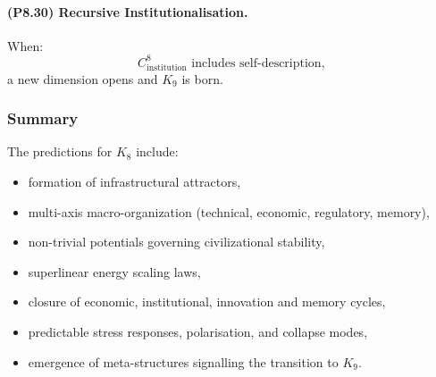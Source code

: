 \paragraph{(P8.30) Recursive Institutionalisation.}
When:
\[
C_{\mathrm{institution}}^8 
\text{ includes self-description},
\]
a new dimension opens and $K_9$ is born.

\subsubsection{Summary}

The predictions for $K_8$ include:
\begin{itemize}
    \item formation of infrastructural attractors,
    \item multi-axis macro-organization (technical, economic, regulatory, memory),
    \item non-trivial potentials governing civilizational stability,
    \item superlinear energy scaling laws,
    \item closure of economic, institutional, innovation and memory cycles,
    \item predictable stress responses, polarisation, and collapse modes,
    \item emergence of meta-structures signalling the transition to $K_9$.
\end{itemize}
